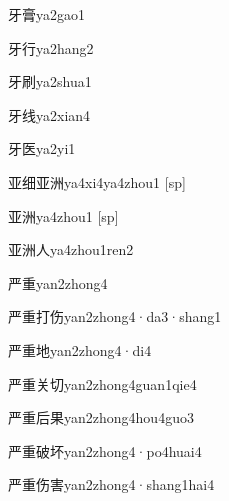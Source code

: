 \begin{verbete}[4;14]{牙膏}{ya2gao1}
\end{verbete}
\begin{verbete}[4;6]{牙行}{ya2hang2}
\end{verbete}
\begin{verbete}[4;8]{牙刷}{ya2shua1}
\end{verbete}
\begin{verbete}[4;8]{牙线}{ya2xian4}
\end{verbete}
\begin{verbete}[4;7]{牙医}{ya2yi1}
\end{verbete}
\begin{verbete*}[6;8;6;9]{亚细亚洲}{ya4xi4ya4zhou1}
  [sp]
\end{verbete*}
\begin{verbete*}[6;9]{亚洲}{ya4zhou1}
  [sp]
\end{verbete*}
\begin{verbete}[6;9;2]{亚洲人}{ya4zhou1ren2}
\end{verbete}
\begin{verbete}[7;9]{严重}{yan2zhong4}
\end{verbete}
\begin{verbete}[7;9;5;6]{严重打伤}{yan2zhong4·da3·shang1}
\end{verbete}
\begin{verbete}[7;9;6]{严重地}{yan2zhong4·di4}
\end{verbete}
\begin{verbete}[7;9;6;4]{严重关切}{yan2zhong4guan1qie4}
\end{verbete}
\begin{verbete}[7;9;6;8]{严重后果}{yan2zhong4hou4guo3}
\end{verbete}
\begin{verbete}[7;9;10;7]{严重破坏}{yan2zhong4·po4huai4}
\end{verbete}
\begin{verbete}[7;9;6;10]{严重伤害}{yan2zhong4·shang1hai4}
\end{verbete}
